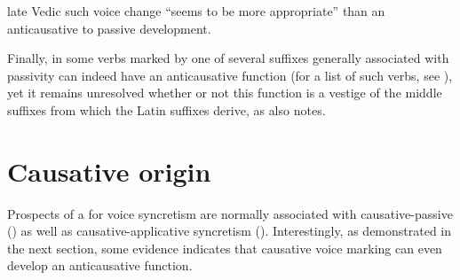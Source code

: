 late Vedic  such voice change “seems to be more appropriate” than an anticausative to passive development.

Finally, in  some verbs marked by one of several suffixes generally associated with passivity can indeed have an anticausative function (for a list of such verbs, see \citealt[227]{miller:d:g:1993}), yet it remains unresolved whether or not this function is a vestige of the  middle suffixes from which the Latin suffixes derive, as \citet[247]{kulikov:2011b} also notes. 

\section{Causative origin} \label{diachrony:causative}
Prospects of a  for voice syncretism are normally associated with causative-passive () as well as causative-applicative syncretism (). Interestingly, as demonstrated in the next section, some evidence indicates that causative voice marking can even develop an anticausative function.

